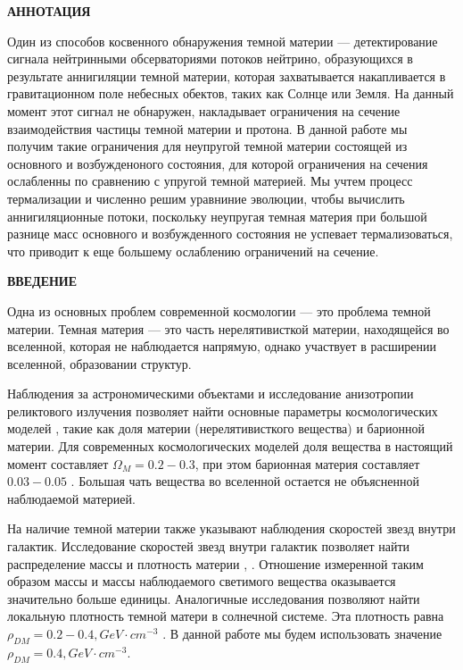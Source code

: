 \newpage
\begin{center}
  \textbf{\large АННОТАЦИЯ}
\end{center}

Один из способов косвенного обнаружения темной материи --- детектирование сигнала нейтринными обсерваториями потоков нейтрино, образующихся в результате аннигиляции темной материи, которая захватывается накапливается  в гравитационном поле небесных обектов, таких как Солнце или Земля. На данный момент этот сигнал не обнаружен, накладывает ограничения на сечение взаимодействия частицы темной материи и протона. В данной работе мы получим такие ограничения для неупругой темной материи состоящей из основного и возбужденоного состояния, для которой ограничения на сечения ослабленны по сравнению с упругой темной материей. Мы учтем процесс термализации и численно решим уравниние эволюции, чтобы вычислить аннигиляционные потоки, поскольку неупругая темная материя при большой разнице масс основного и возбужденного состояния не успевает термализоваться, что приводит к еще большему ослаблению ограничений на сечение.

\onehalfspacing
\setcounter{page}{2}

\newpage
\renewcommand{\contentsname}{\centerline{\large СОДЕРЖАНИЕ}}
\tableofcontents

\newpage
\begin{center}
  \textbf{\large ВВЕДЕНИЕ}
\end{center}


Одна из основных проблем современной космологии --- это проблема темной материи.  Темная материя --- это часть нерелятивисткой материи, находящейся во вселенной, которая не наблюдается напрямую, однако участвует в расширении вселенной, образовании структур. 


Наблюдения за астрономическими объектами и исследование анизотропии реликтового излучения позволяет найти основные параметры космологических моделей , такие как доля материи (нерелятивисткого вещества) и барионной материи. Для современных космологических моделей доля вещества в настоящий момент составляет $\Omega_M = 0.2-0.3$, при этом барионная материя составляет $0.03-0.05$ \cite{Cao_2023}. Большая чать вещества во вселенной остается не объясненной наблюдаемой материей.

На наличие темной материи также указывают наблюдения скоростей звезд внутри галактик. Исследование скоростей звезд внутри галактик позволяет найти распределение массы и плотность материи \cite{Radial_velocity_measurements}, \cite{Angular_Velocity}. Отношение измеренной таким образом массы и массы наблюдаемого светимого вещества оказывается значительно больше единицы. Аналогичные исследования позволяют найти локальную плотность темной матери в солнечной системе. Эта плотность равна $\rho_{DM} = 0.2 - 0.4, GeV \cdot cm^{-3}$ \cite{palau2022oblateness}. В данной работе мы будем использовать значение  $\rho_{DM} = 0.4, GeV \cdot  cm^{-3}$.


